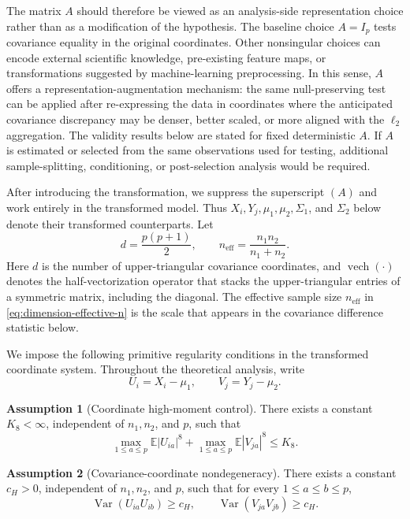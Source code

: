 \documentclass[
  12pt]{article}
\theoremstyle{plain}
\theoremstyle{definition}
\newtheorem{assumption}{Assumption}[section]
\theoremstyle{remark}
\begin{document}
The matrix \(A\) should therefore be viewed as an analysis-side representation
choice rather than as a modification of the hypothesis.  The baseline choice
\(A=I_p\) tests covariance equality in the original coordinates.  Other
nonsingular choices can encode external scientific knowledge, pre-existing
feature maps, or transformations suggested by machine-learning preprocessing.
In this sense, \(A\) offers a representation-augmentation mechanism: the same
null-preserving test can be applied after re-expressing the data in coordinates
where the anticipated covariance discrepancy may be denser, better scaled, or
more aligned with the \(\ell_2\) aggregation.  The validity results below are
stated for fixed deterministic \(A\).  If \(A\) is estimated or selected from
the same observations used for testing, additional sample-splitting,
conditioning, or post-selection analysis would be required.

After introducing the transformation, we suppress the superscript \((A)\) and
work entirely in the transformed model.  Thus \(X_i,Y_j,\mu_1,\mu_2,\Sigma_1\),
and \(\Sigma_2\) below denote their transformed counterparts.  Let
\begin{equation}
\label{eq:dimension-effective-n}
d=\frac{p(p+1)}2,
\qquad
n_{\mathrm{eff}}=\frac{n_1n_2}{n_1+n_2}.
\end{equation}
Here \(d\) is the number of upper-triangular covariance coordinates, and
\(\operatorname{vech}(\cdot)\) denotes the half-vectorization operator that
stacks the upper-triangular entries of a symmetric matrix, including the
diagonal.  The effective sample size \(n_{\mathrm{eff}}\) in
\eqref{eq:dimension-effective-n} is the scale that appears in the covariance
difference statistic below.

We impose the following primitive regularity conditions in the transformed
coordinate system.  Throughout the theoretical analysis, write
\[
U_i=X_i-\mu_1,
\qquad
V_j=Y_j-\mu_2.
\]

\begin{assumption}[Coordinate high-moment control]
\label{ass:coordinate_high_moment}
There exists a constant \(K_8<\infty\), independent of \(n_1,n_2\), and \(p\),
such that
\[
\max_{1\le a\le p}\mathbb E|U_{ia}|^8
+
\max_{1\le a\le p}\mathbb E|V_{ja}|^8
\le K_8 .
\]
\end{assumption}

\begin{assumption}[Covariance-coordinate nondegeneracy]
\label{ass:coordinate_nondegeneracy}
There exists a constant \(c_H>0\), independent of \(n_1,n_2\), and \(p\), such
that for every \(1\le a\le b\le p\),
\[
\operatorname{Var}(U_{ia}U_{ib})\ge c_H,
\qquad
\operatorname{Var}(V_{ja}V_{jb})\ge c_H .
\]
\end{assumption}
\end{document}
